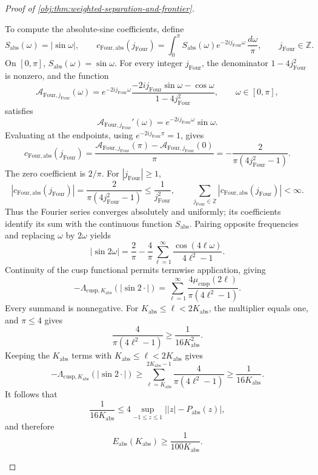 \begin{proof}[Proof of \cref{obj:thm:weighted-separation-and-frontier}]
\begin{enumerate}
To compute the absolute-sine coefficients, define
\[
S_{\mathrm{abs}}(\omega)=|\sin\omega|,
\qquad
c_{\mathrm{Four},\mathrm{abs}}(j_{\mathrm{Four}})
=\int_0^\pi S_{\mathrm{abs}}(\omega)e^{-2ij_{\mathrm{Four}}\omega}
 \,\frac{d\omega}{\pi},
\qquad j_{\mathrm{Four}}\in\mathbb Z.
\]
On \([0,\pi]\), \(S_{\mathrm{abs}}(\omega)=\sin\omega\). For every integer
\(j_{\mathrm{Four}}\), the denominator \(1-4j_{\mathrm{Four}}^2\) is nonzero, and the function
\[
\mathcal A_{\mathrm{Four},j_{\mathrm{Four}}}(\omega)
=e^{-2ij_{\mathrm{Four}}\omega}
\frac{-2ij_{\mathrm{Four}}\sin\omega-\cos\omega}
 {1-4j_{\mathrm{Four}}^2},
\qquad \omega\in[0,\pi],
\]
satisfies
\[
\mathcal A_{\mathrm{Four},j_{\mathrm{Four}}}'(\omega)
=e^{-2ij_{\mathrm{Four}}\omega}\sin\omega.
\]
Evaluating at the endpoints, using
\(e^{-2ij_{\mathrm{Four}}\pi}=1\), gives
\[
c_{\mathrm{Four},\mathrm{abs}}(j_{\mathrm{Four}})
=\frac{\mathcal A_{\mathrm{Four},j_{\mathrm{Four}}}(\pi)
 -\mathcal A_{\mathrm{Four},j_{\mathrm{Four}}}(0)}{\pi}
=-\frac2{\pi(4j_{\mathrm{Four}}^2-1)}.
\]
The zero coefficient is \(2/\pi\). For \(|j_{\mathrm{Four}}|\ge1\),
\[
|c_{\mathrm{Four},\mathrm{abs}}(j_{\mathrm{Four}})|
=\frac2{\pi(4j_{\mathrm{Four}}^2-1)}
\le\frac1{j_{\mathrm{Four}}^2},
\qquad
\sum_{j_{\mathrm{Four}}\in\mathbb Z}
 |c_{\mathrm{Four},\mathrm{abs}}(j_{\mathrm{Four}})|<\infty.
\]
Thus the Fourier series converges absolutely and uniformly; its coefficients identify its sum with the continuous function \(S_{\mathrm{abs}}\). Pairing opposite frequencies and replacing \(\omega\) by \(2\omega\) yields
\[
|\sin2\omega|
=\frac2\pi-\frac4\pi
 \sum_{\ell=1}^\infty\frac{\cos(4\ell\omega)}{4\ell^2-1}.
\]
Continuity of the cusp functional permits termwise application, giving
\[
-\Lambda_{\mathrm{cusp},K_{\mathrm{abs}}}(|\sin2\cdot|)
=\sum_{\ell=1}^\infty
 \frac{4\mu_{\mathrm{cusp}}(2\ell)}{\pi(4\ell^2-1)}.
\]
Every summand is nonnegative. For
\(K_{\mathrm{abs}}\le\ell<2K_{\mathrm{abs}}\), the multiplier equals one, and \(\pi\le4\) gives
\[
\frac4{\pi(4\ell^2-1)}\ge\frac1{16K_{\mathrm{abs}}^2}.
\] Keeping the
\(K_{\mathrm{abs}}\) terms with
\(K_{\mathrm{abs}}\le\ell<2K_{\mathrm{abs}}\) gives
\[
-\Lambda_{\mathrm{cusp},K_{\mathrm{abs}}}(|\sin2\cdot|)
\ge
\sum_{\ell=K_{\mathrm{abs}}}^{2K_{\mathrm{abs}}-1}
\frac4{\pi(4\ell^2-1)}
\ge\frac1{16K_{\mathrm{abs}}}.
\]
It follows that
\[
\frac1{16K_{\mathrm{abs}}}
\le
4\sup_{-1\le z\le1}\bigl||z|-P_{\mathrm{abs}}(z)\bigr|,
\]
and therefore
\[
E_{\mathrm{abs}}(K_{\mathrm{abs}})
\ge\frac1{100K_{\mathrm{abs}}}.
\]


\end{enumerate}
\end{proof}
